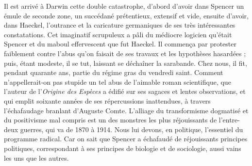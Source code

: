 \documentclass[french,twoside]{book} %
\begin{document}
Il est arrivé à Darwin cette double catastrophe, d’abord d’avoir dans Spencer un émule de seconde zone, un succédané prétentieux, extensif et vide, ensuite d’avoir, dans Haeckel, l’outrance et la caricature germaniques de ses très intéressantes constatations. Cet imaginatif scrupuleux a pâli du médiocre logicien qu’était Spencer et du maboul effervescent que fut Haeckel. Il commença par protester faiblement contre l’abus qu’on faisait de ses travaux et les hypothèses hasardées ; puis, étant modeste, il se tut, laissant se déchaîner la sarabande. Chez nous, il fit, pendant quarante ans, partie du régime gras du vendredi saint. Comment n’appellerait-on pas stupide un tel abus de l’aimable roman scientifique, que l’auteur de l’{\itshape Origine des Espèces} a édifié sur ses sagaces et lentes observations, et qui emplit soixante années de ses répercussions inattendues, à travers l’échafaudage branlant d’Auguste Comte. L’alliage du transformisme dogmatisé et du positivisme mal compris est un des monstres les plus réjouissants de l’entre-deux guerres, qui va de 1870 à 1914. Nous lui devons, en politique, l’essentiel du programme radical. Car on sait que Spencer a échafaudé de réjouissants principes politiques, correspondant à ses principes de biologie et de sociologie, aussi vains les uns que les autres.\par
\end{document}
